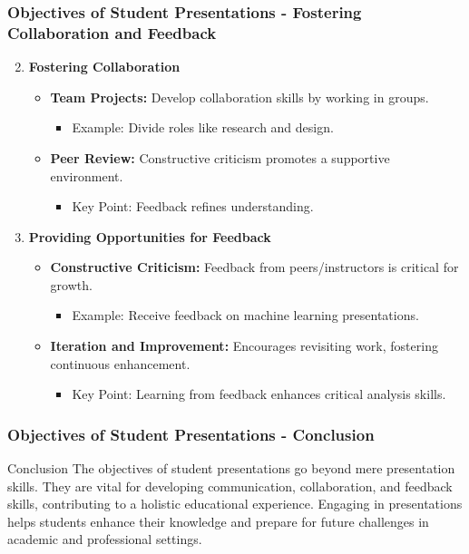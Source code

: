 \documentclass{beamer}
\begin{document}
\begin{frame}[fragile]
    \frametitle{Objectives of Student Presentations - Fostering Collaboration and Feedback}
    \begin{enumerate}
        \setcounter{enumi}{1} %
        \item \textbf{Fostering Collaboration}
        \begin{itemize}
            \item \textbf{Team Projects:} 
            Develop collaboration skills by working in groups.
            \begin{itemize}
                \item Example: Divide roles like research and design.
            \end{itemize}
            \item \textbf{Peer Review:} 
            Constructive criticism promotes a supportive environment.
            \begin{itemize}
                \item Key Point: Feedback refines understanding.
            \end{itemize}
        \end{itemize}
        
        \item \textbf{Providing Opportunities for Feedback}
        \begin{itemize}
            \item \textbf{Constructive Criticism:} 
            Feedback from peers/instructors is critical for growth.
            \begin{itemize}
                \item Example: Receive feedback on machine learning presentations.
            \end{itemize}
            \item \textbf{Iteration and Improvement:} 
            Encourages revisiting work, fostering continuous enhancement.
            \begin{itemize}
                \item Key Point: Learning from feedback enhances critical analysis skills.
            \end{itemize}
        \end{itemize}
    \end{enumerate}
\end{frame}

\begin{frame}[fragile]
    \frametitle{Objectives of Student Presentations - Conclusion}
    \begin{block}{Conclusion}
        The objectives of student presentations go beyond mere presentation skills.
        They are vital for developing communication, collaboration, and feedback skills,
        contributing to a holistic educational experience. Engaging in presentations helps students
        enhance their knowledge and prepare for future challenges in academic and professional settings.
    \end{block}
\end{frame}
\end{document}
